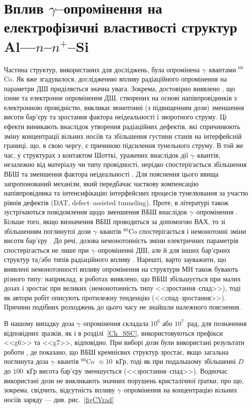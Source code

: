 \section{Вплив $\gamma$--опромінення на електрофізичні властивості структур Al---$n$--$n^+$--Si\label{MSSi_Rad}}
Частина структур, використаних для досліджень, була опромінена $\gamma$--квантами $^{60}$Co.
Як вже згадувалося, дослідженню впливу радіаційного опромінення на параметри ДШ приділяється значна увага.
Зокрема, достовірно виявлено \cite{Kumar1, Rao, Kumar2, Sharma, Ohyama}, що іонне та електронне опромінення ДШ,
створених на основі напівпровідників з електронною провідністю, викликає
монотонні (з підвищенням дози) зменшення висоти бар'єру та зростання фактора неідеальності і зворотного струму.
Ці ефекти виникають внаслідок утворення радіаційних дефектів, які спричинюють зміну концентрації вільних носіїв та
збільшення густини станів на інтерфейсній границі, що, в свою чергу, є причиною підсилення тунельного струму.
В той же час, у структурах з контактом Шотткі, уражених внаслідок дії $\gamma$--квантів, незалежно від матеріалу чи типу провідності,
нерідко спостерігається збільшення ВБШ та зменшення фактора неідеальності \cite{Tataroglu,Tascioglu2010old,Tataroglu:2007NIMA}.
Для пояснення цього явища запропонований \cite{Tataroglu:2007NIMA} механізм, який передбачає
часткову компенсацію напівпровідника та інтенсифікацію інтерфейсних процесів тунелювання за участю рівнів дефектів (DAT, defect--assisted tunneling).
Проте, в літературі також зустрічаються повідомлення щодо зменшення ВБШ внаслідок $\gamma$--опромінення \cite{Tataroglu3}.
Більше того, якщо визначення ВБШ проводиться за допомогою ВАХ, то зі збільшенням поглинутої дози $\gamma$--квантів $^{60}$Co спостерігається
і немонотонні зміни висоти бар'єру \cite{Karatas:2006NIMA,Umana,Verma}.
До речі, дозова немонотонність зміни електричних параметрів спостерігається не лише при $\gamma$--опроміненні ДШ,
але й для інших бар'єрних структур \cite{Kinoshita} та/або типів радіаційного впливу \cite{Vorobets, Pattabi, Kovalyuk}.
Нарешті, варто зауважити, що виявлені немонотонності впливу опромінення на структури МН також бувають різного типу:
наприклад, в роботах \cite{Karatas:2006NIMA, Vorobets, Pattabi} виявлено, що ВБШ збільшується
при малих дозах і зростає при великих (немонотонність типу <<зростання--спад>>), тоді як автори робіт \cite{Umana,Verma} описують протилежну тенденцію (<<спад--зростання>>).
Причини подібних розходжень до цього часу не знайшли належного пояснення.

В нашому випадку доза $\gamma$--опромінення складала $10^6$ або $10^7$~рад, для позначення відповідних зразків, як і в розділі~\ref{Ch_SSC}, використовуються префікси <<g6>> та <<g7>>, відповідно.
При виборі дози були використані результати роботи \cite{Karatas:2006NIMA}, де показано,
що ВБШ кремнієвих структур зростає, якщо загальна поглинута доза $\gamma$--квантів $^{60}$Co $\approx10$~кГр, тоді як при подальшому збільшенні
$D$ до $100$~кГр висота бар'єру зменшується (<<зростання--спад>>).
Водночас використані дози не викликають значних порушень кристалічної ґратки,
про що, зокрема, свідчить, відсутність впливу $\gamma$--опромінення на концентрацію вільних носіїв заряду --- див. рис.~\ref{figCVrad}

